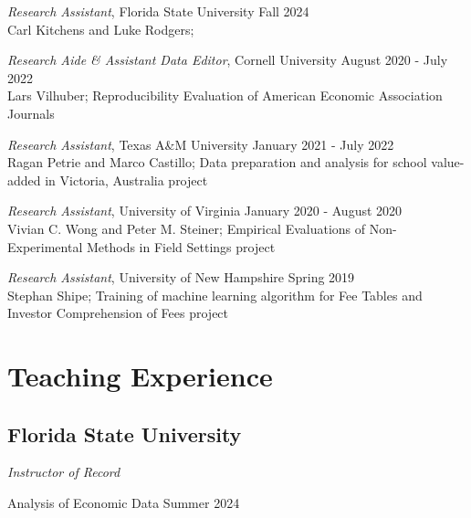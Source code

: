 \documentclass[letterpaper]{article}
\renewenvironment{itemize}{
  \begin{list}{}{
    \setlength{\leftmargin}{1.5em}
  }
}{
  \end{list}
}
\begin{document}
\begin{itemize}
    \item \textit{Research Assistant}, Florida State University \hfill Fall 2024 \\
    Carl Kitchens and Luke Rodgers;  
    
    \item \textit{Research Aide \& Assistant Data Editor}, Cornell University \hfill August 2020 - July 2022 \\
    Lars Vilhuber; Reproducibility Evaluation of American Economic Association Journals 

    \item \textit{Research Assistant}, Texas A\&M University \hfill January 2021 - July 2022 \\
    Ragan Petrie and Marco Castillo;  Data preparation and analysis for school value-added in Victoria, Australia project

    \item \textit{Research Assistant}, University of Virginia \hfill January 2020 - August 2020 \\
    Vivian C. Wong and Peter M. Steiner; Empirical Evaluations of Non-Experimental Methods in Field Settings project

    \item \textit{Research Assistant}, University of New Hampshire \hfill Spring 2019 \\
    Stephan Shipe; Training of machine learning algorithm for Fee Tables and Investor Comprehension of Fees project

\end{itemize}

\section*{Teaching Experience}

\subsection*{Florida State University}

\begin{itemize}

    \item \textit{Instructor of Record} 

    \hspace{10pt} Analysis of Economic Data \hfill Summer 2024
    
\end{itemize}
\end{document}
